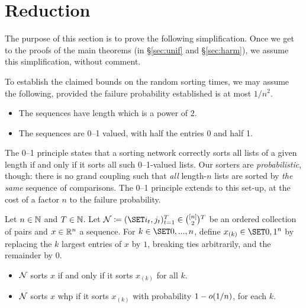 \documentclass{article}
\begin{document}
\section{Reduction}%
\label{sec:prelim:reduction}

The purpose of this section is to prove the following simplification.
Once we get to the proofs of the main theorems (in \S\ref{sec:unif} and \S\ref{sec:harm}), we assume this simplification, without comment.

\begin{reduction}
\label{res:prelim:reduction}
To establish the claimed bounds on the random sorting times,
we may assume the following,
provided the failure probability established is at most $1/n^2$.
\begin{itemize}
	\item 
	The sequences have length which is a power of $2$.
	
	\item 
	The sequences are 0--1 valued, with half the entries 0 and half 1.
\end{itemize}
\end{reduction}

The 0--1 principle
states that a sorting network correctly sorts all lists of a given length if and only if it sorts all such 0--1-valued lists.
Our sorters are \emph{probabilistic}, though: there is no grand coupling such that \emph{all} length-$n$ lists are sorted by \emph{the same} sequence of comparisons.
The 0--1 principle extends to this set-up, at the cost of a factor $n$ to the failure probability.

\begin{prop}%
Let $n \in \mathbb{N}$ and $T \in \mathbb{N}$.
Let $\mcn \cq \rbr{ \set{i_t, j_t} }_{t=1}^T \in \binom{[n]}2{}^T$ be an ordered collection of pairs and $x \in \mathbb{R}^n$ a sequence.
For $k \in \set{0, ..., n}$, define $x_{(k)} \in \set{0,1}^n$ by replacing the $k$ largest entries of $x$ by $1$, breaking ties arbitrarily, and the remainder by $0$.
\begin{itemize}
	\item 
	$\mathcal{N}$ sorts $x$ if and only if it sorts $x_{(k)}$ for all $k$.
	
	\item 
	$\mathcal{N}$ sorts $x$ whp if it sorts $x_{(k)}$ with probability $1 - o( 1/n )$, for each $k$.
\end{itemize}
\end{prop}
\end{document}
